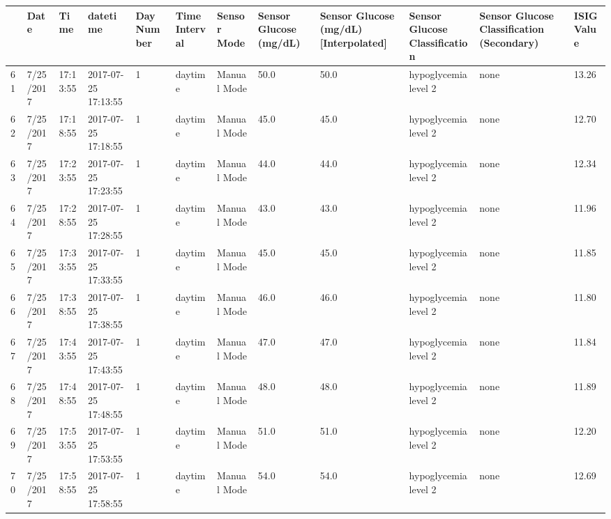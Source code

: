 \bigskip\noindent
\begin{tabular}{p{}p{}p{}p{}p{}p{}p{}p{}p{}p{}p{}p{}}
\toprule
 & Date & Time & datetime & Day Number & Time Interval & Sensor Mode & Sensor Glucose (mg/dL) & Sensor Glucose (mg/dL) [Interpolated] & Sensor Glucose Classification & Sensor Glucose Classification (Secondary) & ISIG Value \\
\hline
61 & 7/25/2017 & 17:13:55 & 2017-07-25 17:13:55 & 1 & daytime & Manual Mode & 50.0 & 50.0 & hypoglycemia level 2 & none & 13.26 \\
\hline
62 & 7/25/2017 & 17:18:55 & 2017-07-25 17:18:55 & 1 & daytime & Manual Mode & 45.0 & 45.0 & hypoglycemia level 2 & none & 12.70 \\
\hline
63 & 7/25/2017 & 17:23:55 & 2017-07-25 17:23:55 & 1 & daytime & Manual Mode & 44.0 & 44.0 & hypoglycemia level 2 & none & 12.34 \\
\hline
64 & 7/25/2017 & 17:28:55 & 2017-07-25 17:28:55 & 1 & daytime & Manual Mode & 43.0 & 43.0 & hypoglycemia level 2 & none & 11.96 \\
\hline
65 & 7/25/2017 & 17:33:55 & 2017-07-25 17:33:55 & 1 & daytime & Manual Mode & 45.0 & 45.0 & hypoglycemia level 2 & none & 11.85 \\
\hline
66 & 7/25/2017 & 17:38:55 & 2017-07-25 17:38:55 & 1 & daytime & Manual Mode & 46.0 & 46.0 & hypoglycemia level 2 & none & 11.80 \\
\hline
67 & 7/25/2017 & 17:43:55 & 2017-07-25 17:43:55 & 1 & daytime & Manual Mode & 47.0 & 47.0 & hypoglycemia level 2 & none & 11.84 \\
\hline
68 & 7/25/2017 & 17:48:55 & 2017-07-25 17:48:55 & 1 & daytime & Manual Mode & 48.0 & 48.0 & hypoglycemia level 2 & none & 11.89 \\
\hline
69 & 7/25/2017 & 17:53:55 & 2017-07-25 17:53:55 & 1 & daytime & Manual Mode & 51.0 & 51.0 & hypoglycemia level 2 & none & 12.20 \\
\hline
70 & 7/25/2017 & 17:58:55 & 2017-07-25 17:58:55 & 1 & daytime & Manual Mode & 54.0 & 54.0 & hypoglycemia level 2 & none & 12.69 \\
\hline

\end{tabular}
